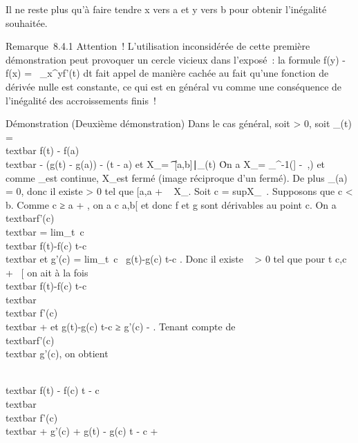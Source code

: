 \documentclass[]{article}
\begin{document}
Il ne reste plus qu'à faire tendre x vers a et y vers b pour obtenir
l'inégalité souhaitée.

Remarque~8.4.1 Attention~! L'utilisation inconsidérée de cette première
démonstration peut provoquer un cercle vicieux dans l'exposé~: la
formule f(y) - f(x) =\int ~
\_x^yf'(t) dt fait appel de manière cachée au fait qu'une
fonction de dérivée nulle est constante, ce qui est en général vu comme
une conséquence de l'inégalité des accroissements finis~!

Démonstration (Deuxième démonstration) Dans le cas général, soit \epsilon
\textgreater{} 0, soit \phi\_\epsilon(t) =\\textbar{} f(t)
- f(a)\\textbar{} - (g(t) - g(a)) - \epsilon(t - a) et
X\_\epsilon = \t \in
{[}a,b{]}∣\phi\_\epsilon(t) \leq
\epsilon\. On a X\_\epsilon = \phi\_\epsilon^-1({]}
-\infty~,\epsilon{]}) et comme \phi\_\epsilon est continue, X\_\epsilon est fermé
(image réciproque d'un fermé). De plus \phi\_\epsilon(a) = 0, donc il
existe \eta \textgreater{} 0 tel que {[}a,a + \eta{]} \subset~ X\_\epsilon. Soit c
= supX\_\epsilon~. Supposons que c \textless{}
b. Comme c ≥ a + \eta, on a c \in{]}a,b{[} et donc f et g sont dérivables au
point c. On a \\textbar{}f'(c)\\textbar{}
= lim\_t\rightarrow~c~\\textbar{}
f(t)-f(c) \over t-c \\textbar{} et g'(c)
= lim\_t\rightarrow~c~ g(t)-g(c)
\over t-c . Donc il existe \alpha~ \textgreater{} 0 tel que
pour t \in{]}c,c + \alpha~{[} on ait à la fois \\textbar{}
f(t)-f(c) \over t-c \\textbar{}
\leq\\textbar{} f'(c)\\textbar{} + \epsilon
{} et  g(t)-g(c) \over t-c ≥
g'(c) - \epsilon {} . Tenant compte de
\\textbar{}f'(c)\\textbar{} \leq g'(c), on
obtient

\\textbar{} f(t) - f(c) \over t - c
\\textbar{} \leq\\textbar{}
f'(c)\\textbar{} + \epsilon {} \leq g'(c)
+ \epsilon {} \leq g(t) - g(c) \over t -
c + \epsilon
\end{document}
